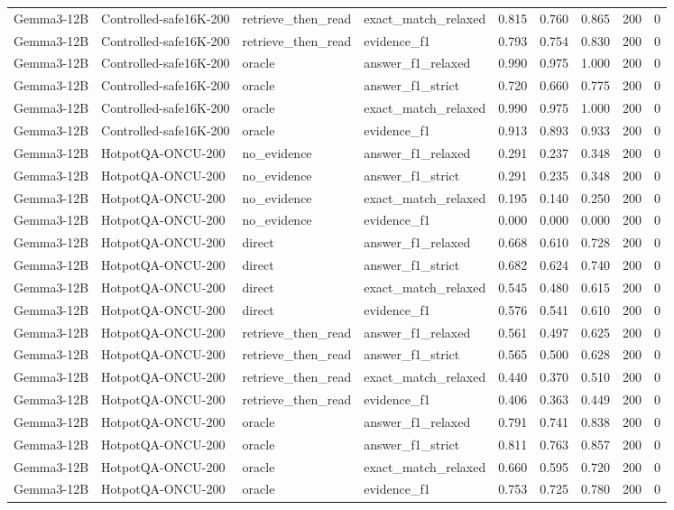 \begin{tabular}{llllrrrrr}
Gemma3-12B & Controlled-safe16K-200 & retrieve_then_read & exact_match_relaxed & 0.815 & 0.760 & 0.865 & 200 & 0 \\
Gemma3-12B & Controlled-safe16K-200 & retrieve_then_read & evidence_f1 & 0.793 & 0.754 & 0.830 & 200 & 0 \\
Gemma3-12B & Controlled-safe16K-200 & oracle & answer_f1_relaxed & 0.990 & 0.975 & 1.000 & 200 & 0 \\
Gemma3-12B & Controlled-safe16K-200 & oracle & answer_f1_strict & 0.720 & 0.660 & 0.775 & 200 & 0 \\
Gemma3-12B & Controlled-safe16K-200 & oracle & exact_match_relaxed & 0.990 & 0.975 & 1.000 & 200 & 0 \\
Gemma3-12B & Controlled-safe16K-200 & oracle & evidence_f1 & 0.913 & 0.893 & 0.933 & 200 & 0 \\
Gemma3-12B & HotpotQA-ONCU-200 & no_evidence & answer_f1_relaxed & 0.291 & 0.237 & 0.348 & 200 & 0 \\
Gemma3-12B & HotpotQA-ONCU-200 & no_evidence & answer_f1_strict & 0.291 & 0.235 & 0.348 & 200 & 0 \\
Gemma3-12B & HotpotQA-ONCU-200 & no_evidence & exact_match_relaxed & 0.195 & 0.140 & 0.250 & 200 & 0 \\
Gemma3-12B & HotpotQA-ONCU-200 & no_evidence & evidence_f1 & 0.000 & 0.000 & 0.000 & 200 & 0 \\
Gemma3-12B & HotpotQA-ONCU-200 & direct & answer_f1_relaxed & 0.668 & 0.610 & 0.728 & 200 & 0 \\
Gemma3-12B & HotpotQA-ONCU-200 & direct & answer_f1_strict & 0.682 & 0.624 & 0.740 & 200 & 0 \\
Gemma3-12B & HotpotQA-ONCU-200 & direct & exact_match_relaxed & 0.545 & 0.480 & 0.615 & 200 & 0 \\
Gemma3-12B & HotpotQA-ONCU-200 & direct & evidence_f1 & 0.576 & 0.541 & 0.610 & 200 & 0 \\
Gemma3-12B & HotpotQA-ONCU-200 & retrieve_then_read & answer_f1_relaxed & 0.561 & 0.497 & 0.625 & 200 & 0 \\
Gemma3-12B & HotpotQA-ONCU-200 & retrieve_then_read & answer_f1_strict & 0.565 & 0.500 & 0.628 & 200 & 0 \\
Gemma3-12B & HotpotQA-ONCU-200 & retrieve_then_read & exact_match_relaxed & 0.440 & 0.370 & 0.510 & 200 & 0 \\
Gemma3-12B & HotpotQA-ONCU-200 & retrieve_then_read & evidence_f1 & 0.406 & 0.363 & 0.449 & 200 & 0 \\
Gemma3-12B & HotpotQA-ONCU-200 & oracle & answer_f1_relaxed & 0.791 & 0.741 & 0.838 & 200 & 0 \\
Gemma3-12B & HotpotQA-ONCU-200 & oracle & answer_f1_strict & 0.811 & 0.763 & 0.857 & 200 & 0 \\
Gemma3-12B & HotpotQA-ONCU-200 & oracle & exact_match_relaxed & 0.660 & 0.595 & 0.720 & 200 & 0 \\
Gemma3-12B & HotpotQA-ONCU-200 & oracle & evidence_f1 & 0.753 & 0.725 & 0.780 & 200 & 0 \\
\bottomrule
\end{tabular}
